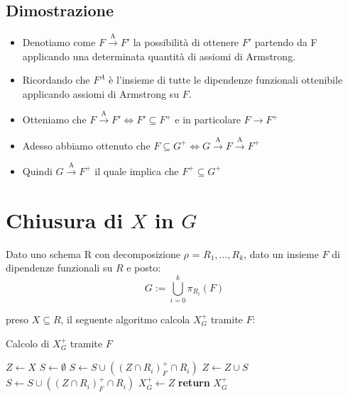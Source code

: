 \documentclass{article}
\begin{document}
\subsection{Dimostrazione}
\begin{itemize}
  \item Denotiamo come $F \xrightarrow{\text{A}} F'$ la possibilità di ottenere $F'$ partendo da F applicando una determinata quantità di assiomi di Armstrong.
  \item  Ricordando che $F^A$ è l'insieme di tutte le dipendenze funzionali ottenibile applicando assiomi di Armstrong su $F$.
  \item Otteniamo che $F \xrightarrow{\text{A}} F' \Leftrightarrow F' \subseteq F^+$ e in particolare $F \rightarrow F^+$
  \item Adesso abbiamo ottenuto che $F \subseteq G^+ \Leftrightarrow G \xrightarrow{\text{A}} F \xrightarrow{\text{A}} F^+$ 
  \item Quindi $G \xrightarrow{\text{A}} F^+$ il quale implica che \textbf{$F^+ \subseteq G^+$}

\end{itemize}



\pagebreak
\section{Chiusura di $X$ in $G$}
Dato uno schema R con decomposizione $\rho$ = $R_1,...,R_k$, dato un insieme $F$ di dipendenze funzionali su $R$ e posto:
\[ G := \bigcup_{i=0}^{k} \pi_{R_i}(F) \]\par
preso $X \subseteq R$, il seguente algoritmo calcola $X_G^+$ tramite $F$:
\begin{algorithm}
  \caption{Calcolo di $X_G^+$ tramite $F$}
  \begin{algorithmic}[1]
          \State $Z \gets X$
          \State $S \gets \emptyset$
              \State $S \gets S \cup ((Z \cap R_i)^+_F \cap R_i)$
          \EndFor
              \State $Z \gets Z \cup S$
                  \State $S \gets S \cup ((Z \cap R_i)^+_F \cap R_i)$
              \EndFor
          \EndWhile
          \State $X_G^+ \gets Z$
          \State \textbf{return} $X_G^+$
      \EndProcedure
  \end{algorithmic}
\end{algorithm}
\end{document}
